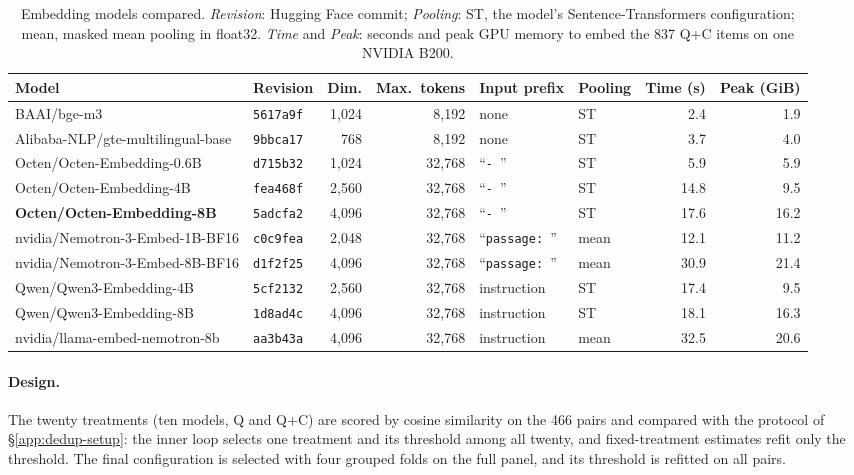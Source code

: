 \begin{table}[t]
\centering
\footnotesize
\setlength{\tabcolsep}{4pt}
\begin{tabular}{@{}llrrllrr@{}}
\toprule
Model & Revision & Dim. & Max.\ tokens & Input prefix & Pooling & Time (s) & Peak (GiB) \\
\midrule
BAAI/bge-m3 & \texttt{5617a9f} & 1,024 & 8,192 & none & ST & 2.4 & 1.9 \\
Alibaba-NLP/gte-multilingual-base & \texttt{9bbca17} & 768 & 8,192 & none & ST & 3.7 & 4.0 \\
Octen/Octen-Embedding-0.6B & \texttt{d715b32} & 1,024 & 32,768 & ``\texttt{- }'' & ST & 5.9 & 5.9 \\
Octen/Octen-Embedding-4B & \texttt{fea468f} & 2,560 & 32,768 & ``\texttt{- }'' & ST & 14.8 & 9.5 \\
\textbf{Octen/Octen-Embedding-8B} & \texttt{5adcfa2} & 4,096 & 32,768 & ``\texttt{- }'' & ST & 17.6 & 16.2 \\
nvidia/Nemotron-3-Embed-1B-BF16 & \texttt{c0c9fea} & 2,048 & 32,768 & ``\texttt{passage: }'' & mean & 12.1 & 11.2 \\
nvidia/Nemotron-3-Embed-8B-BF16 & \texttt{d1f2f25} & 4,096 & 32,768 & ``\texttt{passage: }'' & mean & 30.9 & 21.4 \\
Qwen/Qwen3-Embedding-4B & \texttt{5cf2132} & 2,560 & 32,768 & instruction & ST & 17.4 & 9.5 \\
Qwen/Qwen3-Embedding-8B & \texttt{1d8ad4c} & 4,096 & 32,768 & instruction & ST & 18.1 & 16.3 \\
nvidia/llama-embed-nemotron-8b & \texttt{aa3b43a} & 4,096 & 32,768 & instruction & mean & 32.5 & 20.6 \\
\bottomrule
\end{tabular}
\caption{Embedding models compared. \emph{Revision}: Hugging Face commit;
\emph{Pooling}: ST, the model's Sentence-Transformers configuration; mean,
masked mean pooling in float32. \emph{Time} and \emph{Peak}: seconds and
peak GPU memory to embed the 837 Q+C items on one NVIDIA B200.}
\label{tab:dedup-models}
\end{table}

\paragraph{Design.} The twenty treatments (ten models, Q and Q+C) are scored
by cosine similarity on the 466 pairs and compared with the protocol of
\S\ref{app:dedup-setup}: the inner loop selects one treatment and its
threshold among all twenty, and fixed-treatment estimates refit only the
threshold. The final configuration is selected with four grouped folds on
the full panel, and its threshold is refitted on all pairs.


